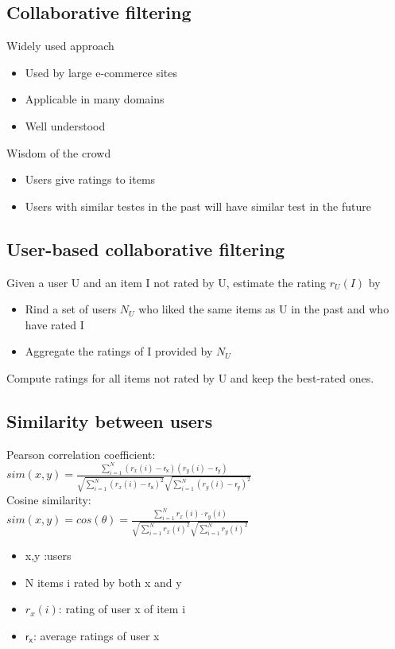 \subsection{Collaborative filtering}
Widely used approach
\begin{itemize}
\item Used by large e-commerce sites
\item Applicable in many domains
\item Well understood
\end{itemize}

Wisdom of the crowd
\begin{itemize}
\item Users give ratings to items
\item Users with similar testes in the past will have similar test in
  the future
\end{itemize}

\subsection{User-based collaborative filtering}
Given a user U and an item I not rated by U, estimate the rating $
r_U(I) $ by
\begin{itemize}
\item Rind a set of users $ N_U $ who liked the same items as U in the
  past and who have rated I
\item Aggregate the ratings of I provided by $ N_U $
\end{itemize}

Compute ratings for all items not rated by U and keep the best-rated
ones.
\subsection{Similarity between users}
Pearson correlation coefficient: \\
$ sim(x, y) = \frac{\sum_{i = 1}^N (r_x(i) - \mathsf{r_x})(r_y(i) -
  \mathsf{r_y})}{\sqrt{\sum_{i = 1}^N (r_x(i) - \mathsf{r_x})^2}
  \sqrt{\sum_{i=1}^N (r_y(i) - \mathsf{r_y})^2}} $ \\

Cosine similarity: \\
$ sim(x, y) = cos(\theta) = \frac{\sum_{i = 1}^N r_x(i) \cdot r_y(i)
}{\sqrt{\sum_{i = 1}^N r_x(i)^2} \sqrt{\sum_{i=1}^N r_y(i)^2}} $

\begin{itemize}
\item x,y :users
\item N items i rated by both x and y
\item $ r_x(i) $: rating of user x of item i
\item $ \mathsf{r_x} $: average ratings of user x
\end{itemize}

